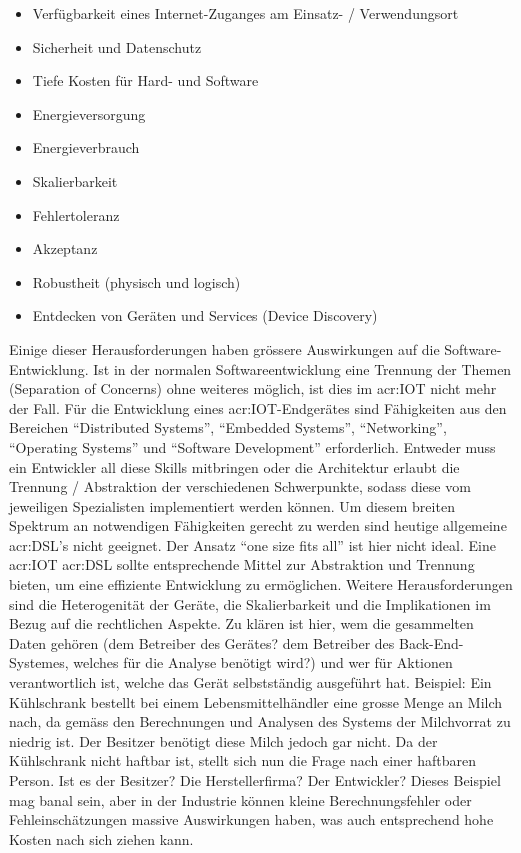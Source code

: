 \begin{itemize}
\item Verfügbarkeit eines Internet-Zuganges am Einsatz- / Verwendungsort
\item Sicherheit und Datenschutz
\item Tiefe Kosten für Hard- und Software
\item Energieversorgung
\item Energieverbrauch
\item Skalierbarkeit
\item Fehlertoleranz
\item Akzeptanz
\item Robustheit (physisch und logisch)
\item Entdecken von Geräten und Services (Device Discovery)
\end{itemize}

Einige dieser Herausforderungen haben grössere Auswirkungen auf die Software-Entwicklung. Ist in der normalen Softwareentwicklung eine Trennung der Themen (Separation of Concerns) ohne weiteres möglich, ist dies im \gls{acr:IOT} nicht mehr der Fall. Für die Entwicklung eines \gls{acr:IOT}-Endgerätes sind Fähigkeiten aus den Bereichen "`Distributed Systems"', "`Embedded Systems"', "`Networking"', "`Operating Systems"' und "`Software Development"' erforderlich. Entweder muss ein Entwickler all diese Skills mitbringen oder die Architektur erlaubt die Trennung / Abstraktion der verschiedenen Schwerpunkte, sodass diese vom jeweiligen Spezialisten implementiert werden können. Um diesem breiten Spektrum an notwendigen Fähigkeiten gerecht zu werden sind heutige allgemeine \gls{acr:DSL}'s nicht geeignet. Der Ansatz "`one size fits all"' ist hier nicht ideal. Eine \gls{acr:IOT} \gls{acr:DSL} sollte entsprechende Mittel zur Abstraktion und Trennung bieten, um eine effiziente Entwicklung zu ermöglichen. Weitere Herausforderungen sind die Heterogenität der Geräte, die Skalierbarkeit und die Implikationen im Bezug auf die rechtlichen Aspekte. Zu klären ist hier, wem die gesammelten Daten gehören (dem Betreiber des Gerätes? dem Betreiber des Back-End-Systemes, welches für die Analyse benötigt wird?) und wer für Aktionen verantwortlich ist, welche das Gerät selbstständig ausgeführt hat. Beispiel: Ein Kühlschrank bestellt bei einem Lebensmittelhändler eine grosse Menge an Milch nach, da gemäss den Berechnungen und Analysen des Systems der Milchvorrat zu niedrig ist. Der Besitzer benötigt diese Milch jedoch gar nicht. Da der Kühlschrank nicht haftbar ist, stellt sich nun die Frage nach einer haftbaren Person. Ist es der Besitzer? Die Herstellerfirma? Der Entwickler? Dieses Beispiel mag banal sein, aber in der Industrie können kleine Berechnungsfehler oder Fehleinschätzungen massive Auswirkungen haben, was auch entsprechend hohe Kosten nach sich ziehen kann.



